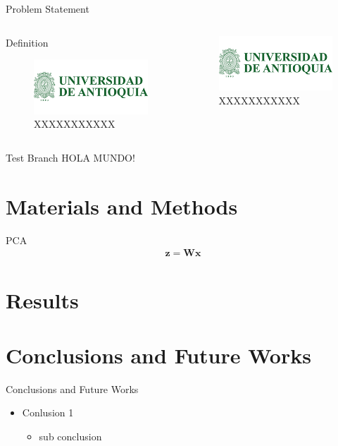 \documentclass{beamer}
\begin{document}
\begin{frame}{Problem Statement}
\begin{columns}
	\begin{column}{0.45\linewidth}
		\begin{block}{Definition}
			\begin{figure}
				\includegraphics[width=0.5\linewidth]{logos/logoUdeA}
				\caption{XXXXXXXXXXX}
			\end{figure}
		\end{block}
	\end{column}
	\begin{column}{0.45\linewidth}
		\begin{figure}
			\includegraphics[width=0.5\linewidth]{logos/logoUdeA}
			\caption{XXXXXXXXXXX}
		\end{figure}
	\end{column}
\end{columns}

\end{frame}

\begin{frame}{Test Branch}
HOLA MUNDO!
\end{frame}
	
	\section{Materials and Methods}
	
	\begin{frame}{PCA}
	\begin{align}
	\mathbf{z} = \mathbf{W}\mathbf{x}
	\end{align}
\end{frame}
	\section{Results}
	\section{Conclusions and Future Works}
	
	\begin{frame}{Conclusions and Future Works}
\begin{itemize}
	\item Conlusion 1
	\begin{itemize}
		\item sub conclusion
	\end{itemize}
\end{itemize}
\end{frame}
\end{document}
